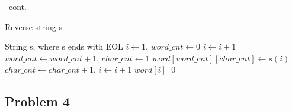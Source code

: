 \documentclass[handout]{beamer}
\begin{document}
        \begin{frame}[c,shrink]{\subsecname\ cont.}          
            \begin{algorithm}[H]
                \caption {Reverse string s}
                \label{alg1}
                \begin{algorithmic}[1]
                    \REQUIRE String s, where s ends with EOL
                    \STATE $i \leftarrow 1$, $word\_cnt \leftarrow 0$ 
                    \STATE $i \leftarrow i+1$
                    \ENDWHILE
                    \STATE $word\_cnt \leftarrow word\_cnt+1$, $char\_cnt \leftarrow 1$
                    \STATE $word[word\_cnt][char\_cnt] \leftarrow s(i)$
                    \STATE $char\_cnt \leftarrow char\_cnt + 1$, $i \leftarrow i+1$
                    \ENDWHILE
                    \ENDIF
                    \ENDWHILE
                    \PRINT $word[i]$
                    \ENDFOR \qed
                \end{algorithmic}
            \end{algorithm}        
        \end{frame}
        
        
        
    \subsection{Problem 4}
    
\end{document}
